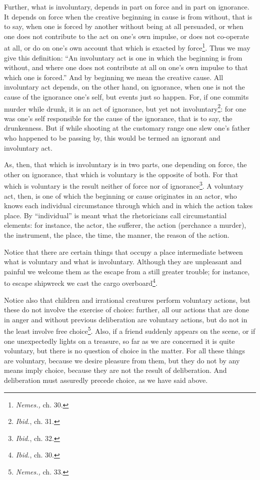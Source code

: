 Further, what is involuntary, depends in part on force and in part on ignorance. It depends on force when the creative beginning in cause is from without, that is to say, when one is forced by another without being at all persuaded, or when one does not contribute to the act on one’s own impulse, or does not co-operate at all, or do on one’s own account that which is exacted by force\footnote{\emph{Nemes.,} ch. 30.}. Thus we may give this definition: “An involuntary act is one in which the beginning is from without, and where one does not contribute at all on one’s own impulse to that which one is forced.” And by beginning we mean the creative cause. All involuntary act depends, on the other hand, on ignorance, when one is not the cause of the ignorance one’s self, but events just so happen. For, if one commits murder while drunk, it is an act of ignorance, but yet not involuntary\footnote{\emph{Ibid.}, ch. 31.}: for one was one’s self responsible for the cause of the ignorance, that is to say, the drunkenness. But if while shooting at the customary range one slew one’s father who happened to be passing by, this would be termed an ignorant and involuntary act.

As, then, that which is involuntary is in two parts, one depending on force, the other on ignorance, that which is voluntary is the opposite of both. For that which is voluntary is the result neither of force nor of ignorance\footnote{\emph{Ibid.}, ch. 32.}. A voluntary act, then, is one of which the beginning or cause originates in an actor, who knows each individual circumstance through which and in which the action takes place. By “individual” is meant what the rhetoricians call circumstantial elements: for instance, the actor, the sufferer, the action (perchance a murder), the instrument, the place, the time, the manner, the reason of the action.

Notice that there are certain things that occupy a place intermediate between what is voluntary and what is involuntary. Although they are unpleasant and painful we welcome them as the escape from a still greater trouble; for instance, to escape shipwreck we cast the cargo overboard\footnote{\emph{Ibid.}, ch. 30.}.

Notice also that children and irrational creatures perform voluntary actions, but these do not involve the exercise of choice: further, all our actions that are done in anger and without previous deliberation are voluntary actions, but do not in the least involve free choice\footnote{\emph{Nemes.,} ch. 33.}. Also, if a friend suddenly appears on the scene, or if one unexpectedly lights on a treasure, so far as we are concerned it is quite voluntary, but there is no question of choice in the matter. For all these things are voluntary, because we desire pleasure from them, but they do not by any means imply choice, because they are not the result of deliberation. And deliberation must assuredly precede choice, as we have said above.

